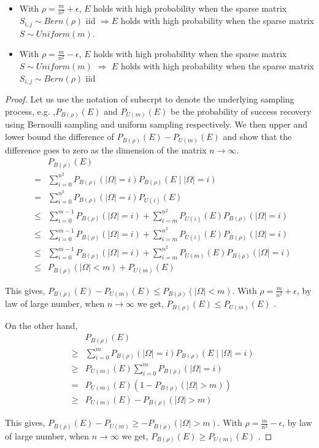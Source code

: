 \begin{itemize}
\item With $\rho=\frac{m}{n^{2}}+\epsilon$, $E$ holds with high probability when the sparse matrix $S_{i,j}\sim Bern(\rho)$ iid $\Longrightarrow$$E$ holds with high probability when the sparse matrix $S\sim Uniform(m)$.
\item With $\rho=\frac{m}{n^{2}}-\epsilon$, $E$ holds with high probability when the sparse matrix $S\sim Uniform(m)$ $\Longrightarrow$ $E$ holds with high probability when the sparse matrix $S_{i,j}\sim Bern(\rho)$
iid
\end{itemize}
\begin{proof}
Let us use the notation of subscrpt to denote the underlying sampling process, e.g. ,$P_{B(\rho)}(E)$ and $P_{U(m)}(E)$ be the probability of success recovery using Bernoulli sampling and uniform sampling respectively. We then upper and lower bound the difference of $P_{B(\rho)}(E)-P_{U(m)}(E)$ and show that the difference goes to zero as the dimension of the matrix $n\to\infty$. \\

\begin{eqnarray*}
 &  & P_{B(\rho)}(E)\\
 & = & \sum_{i=0}^{n^{2}}P_{B(\rho)}(|\Omega|=i)P_{B(\rho)}(E\mid|\Omega|=i)\\
 & = & \sum_{i=0}^{n^{2}}P_{B(\rho)}(|\Omega|=i)P_{U(i)}(E)\\
 & \le & \sum_{i=0}^{m-1}P_{B(\rho)}(|\Omega|=i)+\sum_{i=m}^{n^{2}}P_{U(i)}(E)P_{B(\rho)}(|\Omega|=i)\\
 & \le & \sum_{i=0}^{m-1}P_{B(\rho)}(|\Omega|=i)+\sum_{i=m}^{n^{2}}P_{U(i)}(E)P_{B(\rho)}(|\Omega|=i)\\
 & \le & \sum_{i=0}^{m-1}P_{B(\rho)}(|\Omega|=i)+\sum_{i=m}^{n^{2}}P_{U(m)}(E)P_{B(\rho)}(|\Omega|=i)\\
 & \le & P_{B(\rho)}(|\Omega|<m)+P_{U(m)}(E)
\end{eqnarray*}


This gives, $P_{B(\rho)}(E)-P_{U(m)}(E)\le P_{B(\rho)}(|\Omega|<m)$. With $\rho=\frac{m}{n^{2}}+\epsilon$, by law of large number, when $n\to\infty$ we get, $P_{B(\rho)}(E)\le P_{U(m)}(E)$ .

On the other hand,
\begin{eqnarray*}
 &  & P_{B(\rho)}(E)\\
 & \ge & \sum_{i=0}^{m}P_{B(\rho)}(|\Omega|=i)P_{B(\rho)}(E\mid|\Omega|=i)\\
 & \ge & P_{U(m)}(E)\sum_{i=0}^{m}P_{B(\rho)}(|\Omega|=i)\\
 & = & P_{U(m)}(E)(1-P_{B(\rho)}(|\Omega|>m))\\
 & \ge & P_{U(m)}(E)-P_{B(\rho)}(|\Omega|>m)
\end{eqnarray*}


This gives, $P_{B(\rho)}(E)-P_{U(m)}\ge-P_{B(\rho)}(|\Omega|>m)$. With $\rho=\frac{m}{n^{2}}-\epsilon$, by law of large number, when $n\to\infty$ we get, $P_{B(\rho)}(E)\ge P_{U(m)}(E)$ .
\end{proof}


